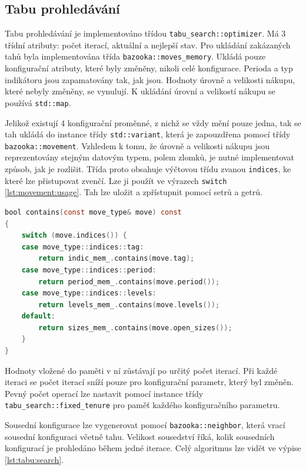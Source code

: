 \subsection{Tabu prohledávání}
Tabu prohledávání je implementováno třídou \texttt{tabu\_search::optimizer}.
Má 3 třídní atributy: počet iterací, aktuální a nejlepší stav.
Pro ukládání zakázaných tahů byla implementována třída \texttt{bazooka::moves\_memory}.
Ukládá pouze konfigurační atributy, které byly změněny, nikoli celé konfigurace.
Perioda a typ indikátoru jsou zapamatovány tak, jak jsou.
Hodnoty úrovně a velikosti nákupu, které nebyly změněny, se vynulují.
K ukládání úrovní a velikostí nákupu se používá \texttt{std::map}.

Jelikož existují 4 konfigurační proměnné, z nichž se vždy mění pouze jedna, tak se tah ukládá do instance třídy \texttt{std::variant}, která je zapouzdřena pomocí třídy \texttt{bazooka::movement}.
Vzhledem k tomu, že úrovně a velikosti nákupu jsou reprezentovány stejným datovým typem, polem zlomků, je nutné implementovat způsob, jak je rozlišit.
Třída proto obsahuje výčtovou třídu zvanou \texttt{indices}, ke které lze přistupovat zvenčí.
Lze ji použít ve výrazech \texttt{switch} \ref{lst:movement:usage}.
Tah lze uložit a zpřístupnit pomocí setrů a getrů.

\begin{lstlisting}[caption={~Použití třídy \texttt{bazooka::movement}},label={lst:movement:usage},captionpos=t,abovecaptionskip=-\medskipamount,belowcaptionskip=\medskipamount,language=C]
bool contains(const move_type& move) const
{
    switch (move.indices()) {
    case move_type::indices::tag:
        return indic_mem_.contains(move.tag);
    case move_type::indices::period:
        return period_mem_.contains(move.period());
    case move_type::indices::levels:
        return levels_mem_.contains(move.levels());
    default:
        return sizes_mem_.contains(move.open_sizes());
    }
}
\end{lstlisting}

Hodnoty vložené do paměti v ní zůstávají po určitý počet iterací.
Při každé iteraci se počet iterací sníží pouze pro konfigurační parametr, který byl změněn.
Pevný počet operací lze nastavit pomocí instance třídy \texttt{tabu\_search::fixed\_tenure} pro paměť každého konfiguračního parametru.

Sousední konfigurace lze vygenerovat pomocí \texttt{bazooka::neighbor}, která vrací sousední konfiguraci včetně tahu.
Velikost sousedství říká, kolik sousedních konfigurací je prohledáno během jedné iterace.
Celý algoritmus lze vidět ve výpise \ref{lst:tabu:search}.


